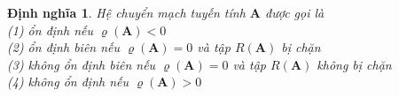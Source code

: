 \documentclass[14pt,a4paper,oneside]{report}		%
\newtheorem{define}[theorem]{Định nghĩa}
\begin{document}
\begin{define}\label{def2-17}
Hệ chuyển mạch tuyến tính $\mathbf{A}$ được gọi là \\
(1) ổn định nếu $\varrho(\mathbf{A})<0$\\
(2) ổn định biên nếu $\varrho(\mathbf{A})=0$ và tập $R(\mathbf{A})$ bị chặn\\
(3) không ổn định biên nếu $\varrho(\mathbf{A})=0$ và tập $R(\mathbf{A})$ không bị chặn\\
(4) không ổn định nếu $\varrho(\mathbf{A})>0$
\end{define}
\end{document}

